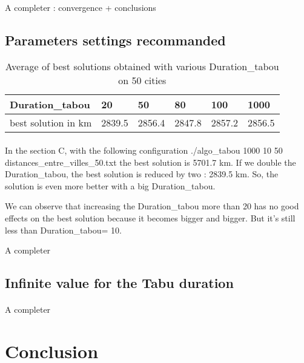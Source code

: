 \documentclass[12pt,oneside,a4paper]{article}
\begin{document}
\paragraph{}
A completer : convergence + conclusions

\newpage
\subsection{Parameters settings recommanded}
\begin{table}[h]
    \centering
    \small
    \begin{tabular}{llllll}
      \hline
      \multicolumn{1}{|l|}{\textbf{Duration\_tabou}}& \multicolumn{1}{l|}{\textbf{20}} & \multicolumn{1}{l|}{\textbf{50}} & \multicolumn{1}{l|}{\textbf{80}} & \multicolumn{1}{l|}{\textbf{100}} & \multicolumn{1}{l|}{\textbf{1000}}\\ \hline
      \multicolumn{1}{|l|}{best solution in km } & \multicolumn{1}{l|}{2839.5}  & \multicolumn{1}{l|}{2856.4}  & \multicolumn{1}{l|}{2847.8}   & \multicolumn{1}{l|}{2857.2}  & \multicolumn{1}{l|}{2856.5} \\ \hline
    \end{tabular}
    \caption{Average of best solutions obtained with various Duration\_tabou on 50 cities}
    \label{Performances scénario 0}
  \end{table}
\paragraph{}
    In the section C, with the following configuration ./algo\_tabou  1000 10 50 distances\_entre\_villes\_50.txt the best solution is 5701.7 km. 
    If we double the Duration\_tabou, the best solution is reduced by two :  2839.5 km.
    So, the solution is even more better with a big Duration\_tabou. 

    We can observe that increasing the Duration\_tabou more than 20 has no good effects on the best solution because it becomes bigger and bigger. 
    But it’s still less than Duration\_tabou= 10. 

    A completer

\subsection{Infinite value for the Tabu duration}
\paragraph{}
    A completer
\section{Conclusion}
\paragraph{}
\end{document}
